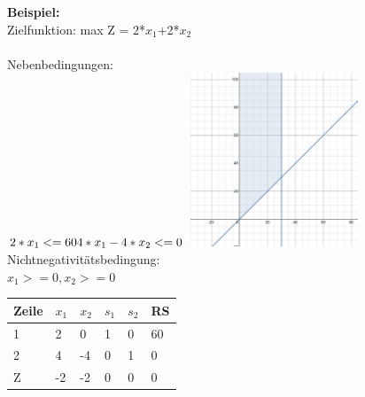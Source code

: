 \textbf{Beispiel: }\\
Zielfunktion: max Z = 2*$x_1$+2*$x_2$\\
\\
Nebenbedingungen:\\
\begin{math}
2*x_1 <= 60\\
4*x_1-4*x_2 <= 0\\
\end{math}
\includegraphics[width=5cm,right]{images/IMG_degenerierte_Losung.jpeg}
Nichtnegativitätsbedingung:\\
\begin{math}
x_1 >= 0, x_2 >= 0
\end{math}
\\
\begin{table}[!ht]
\begin{tabular}{|l|l|l|l|l|l|}
\hline
\rowcolor[HTML]{C0C0C0} 
Zeile                     & $x_1$                       & $x_2$ & $s_1$ & $s_2$ & RS \\ \hline
\rowcolor[HTML]{FFFFFF} 
\cellcolor[HTML]{C0C0C0}1 & 2                         & 0  & 1  & 0  & 60 \\ \hline
\rowcolor[HTML]{FFFFFF} 
\cellcolor[HTML]{C0C0C0}2 & \cellcolor[HTML]{CBCEFB}4 & -4 & 0  & 1  & 0  \\ \hline
\rowcolor[HTML]{FFFFFF} 
\cellcolor[HTML]{C0C0C0}Z & -2                        & -2 & 0  & 0  & 0  \\ \hline
\end{tabular}
\end{table}
\\

